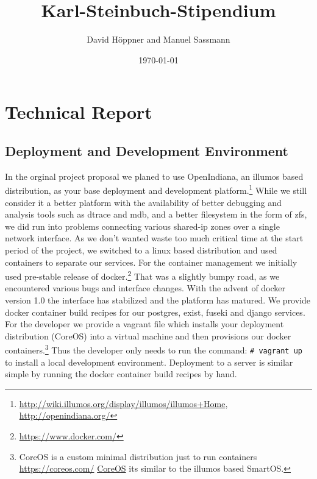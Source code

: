 \documentclass[12pt, draft]{article}
\begin{document}
\title{Karl-Steinbuch-Stipendium}
\author{David Höppner and Manuel Sassmann}
\date{\today}
\maketitle

\begin{abstract}
\end{abstract}

\section{Technical Report}

\subsection{Deployment and Development Environment}

In the orginal project proposal we planed to use OpenIndiana,
an illumos based distribution, as your base deployment and development
platform.\footnote{\url{http://wiki.illumos.org/display/illumos/illumos+Home}, \url{http://openindiana.org/}}
While we still consider it a better platform with
the availability of better debugging and analysis tools
such as dtrace and mdb, and a better filesystem in the form of zfs,
we did run into problems connecting various shared-ip zones over a single network interface.
As we don't wanted waste too much critical time at the
start period of the project, we switched to a linux based
distribution and used containers to separate our
services.  For the container management we initially
used pre-stable release of docker.\footnote{\url{https://www.docker.com/}}
That was a slightly
bumpy road, as we encountered various bugs and interface changes.
With the advent of docker version 1.0 the interface has
stabilized and the platform has matured.
We provide docker container build recipes for our
postgres, exist, fuseki and django services.
For the developer we provide a vagrant file which 
installs your deployment distribution (CoreOS)
into a virtual machine and then provisions our
docker containers.\footnote{CoreOS is a custom minimal distribution just to run
containers \url{https://coreos.com/} \href{https://coreos.com/}{CoreOS} its similar to the illumos based SmartOS.}
Thus the developer only needs to run the command: \lstinline´# vagrant up´
to install a local development environment.
Deployment to a server is similar simple by running the docker container build recipes
by hand.
\end{document}
